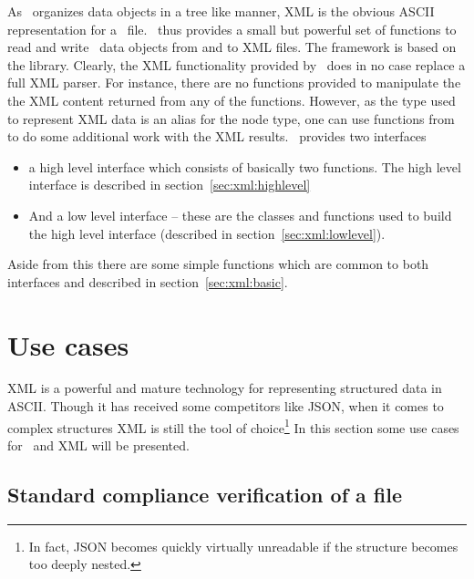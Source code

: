 
As \nexus\ organizes data objects in a tree like manner, XML is the obvious ASCII
representation for a \nexus\ file.
\libpniio\ thus provides a small but powerful set of functions to read and write 
\nexus\ data objects from and to XML files. The framework is based on the 
 library. Clearly, the XML functionality provided 
by \libpniio\ does in no case replace a full XML parser. For instance, there are
no functions provided to manipulate the the XML content returned from 
any of the functions. However, as the  type used to represent 
XML data is an alias for the  node type, one can use
functions from  to do some additional work with the
XML results.
\libpniio\ provides two interfaces\
\begin{itemize}
\item a high level interface which consists of basically two functions. The high
level interface is described in section~\ref{sec:xml:highlevel}
\item And a low level interface -- these are the classes and functions used to
build the high level interface (described in section~\ref{sec:xml:lowlevel}).
\end{itemize}
Aside from this there are some simple functions which are common to both
interfaces and described in section~\ref{sec:xml:basic}.

\section{Use cases}\label{sec:xml:usecases}

XML is a powerful and mature technology for representing structured data in 
ASCII. Though it has received some competitors like JSON, when it comes to 
complex structures XML is still the tool of choice\footnote{In fact, JSON
becomes quickly virtually unreadable if the structure becomes too deeply
nested.}
In this section some use cases for \nexus\ and XML will be presented. 

\subsection{Standard compliance verification of a file}

